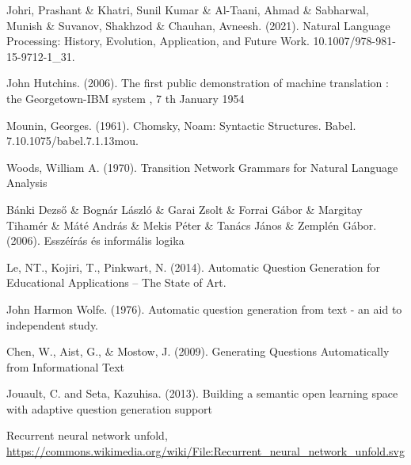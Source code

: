 \documentclass[12pt,a4paper]{report}
\begin{document}


\newpage

\pagestyle{empty}



\cleardoublepage
{}
\tableofcontents
\cleardoublepage
{}

\newpage

\pagestyle{fancy}









\begin{thebibliography}{100}
 Johri, Prashant \& Khatri, Sunil Kumar \& Al-Taani, Ahmad \& Sabharwal, Munish \& Suvanov, Shakhzod \& Chauhan, Avneesh. (2021). Natural Language Processing: History, Evolution, Application, and Future Work. 10.1007/978-981-15-9712-1\_31.

 John Hutchins. (2006). The first public demonstration of machine translation : the Georgetown-IBM system , 7 th January 1954

 Mounin, Georges. (1961). Chomsky, Noam: Syntactic Structures. Babel. 7.10.1075/babel.7.1.13mou.

 Woods, William A. (1970). Transition Network Grammars for Natural Language Analysis

 Bánki Dezső \& Bognár László \& Garai Zsolt \& Forrai Gábor \& Margitay Tihamér \& Máté András \& Mekis Péter \& Tanács János \& Zemplén Gábor. (2006). Esszéírás és informális logika

 Le, NT., Kojiri, T., Pinkwart, N. (2014). Automatic Question Generation for Educational Applications – The State of Art.

 John Harmon Wolfe. (1976). Automatic question generation from text - an aid to independent study.

 Chen, W., Aist, G., \& Mostow, J. (2009). Generating Questions Automatically from Informational Text

 Jouault, C. and Seta, Kazuhisa. (2013). Building a semantic open learning space with adaptive question generation support

 Recurrent neural network unfold, \url{https://commons.wikimedia.org/wiki/File:Recurrent\_neural\_network\_unfold.svg}


\end{thebibliography}
\end{document}
